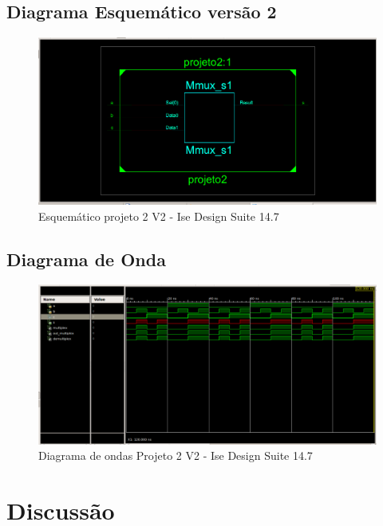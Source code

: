 \documentclass[12pts]{article}
\begin{document}
\newpage
\subsection{Diagrama Esquemático versão 2}
\begin{figure}[!htb]
  \centering
  \includegraphics[scale=0.45]{imagens/esquematico22}
  \caption{Esquemático projeto 2 V2 - Ise Design Suite 14.7}	
  \label{figRotulo}
\end{figure}

\subsection{Diagrama de Onda}

\begin{figure}[!htb]
  \centering
  \includegraphics[scale=0.35]{imagens/onda2}
  \caption{Diagrama de ondas Projeto 2 V2 - Ise Design Suite 14.7}
  \label{figRotulo}
\end{figure}
\newpage


\section{Discussão}

\end{document}
